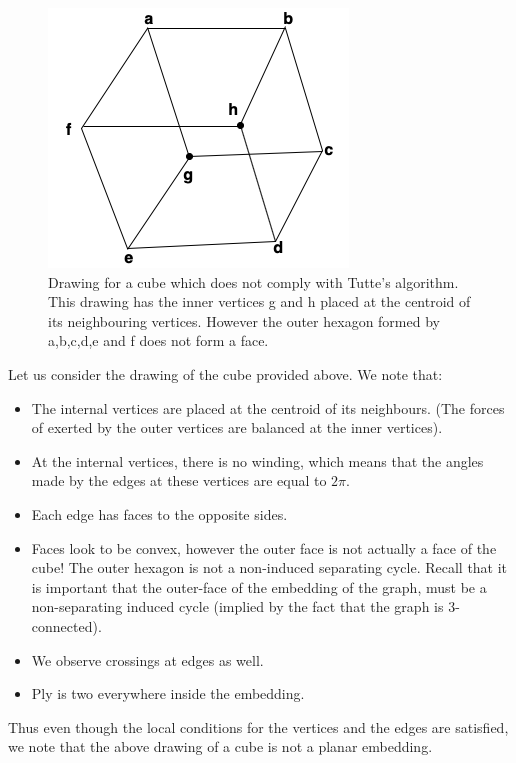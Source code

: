 \documentclass{article}
\begin{document}
        \begin{figure}[H]
        \centering
        \includegraphics[scale=0.5]{Images/cube.png}
        \caption{Drawing for a cube which does not comply with Tutte's algorithm. This drawing has the inner vertices g and h placed at the centroid of its neighbouring vertices. However the outer hexagon formed by a,b,c,d,e and f does not form a face.}
        \label{fig:my_label}
        \end{figure}

    \medskip \noindent Let us consider the drawing of the cube provided above. We note that:
    \begin{itemize}
        \item The internal vertices are placed at the centroid of its neighbours. (The forces of exerted by the outer vertices are balanced at the inner vertices). 
        \item At the internal vertices, there is no winding, which means that the angles made by the edges at these vertices are equal to $2 \pi$.
        \item Each edge has faces to the opposite sides. 
        \item Faces look to be convex, however the outer face is not actually a face of the cube! The outer hexagon is not a non-induced separating cycle. Recall that it is important that the outer-face of the embedding of the graph, must be a non-separating induced cycle (implied by the fact that the graph is 3-connected). 
        \item We observe crossings at edges as well. 
        \item Ply is two everywhere inside the embedding. 
    \end{itemize}
    Thus even though the local conditions for the vertices and the edges are satisfied, we note that the above drawing of a cube is not a planar embedding.
  
\end{document}
